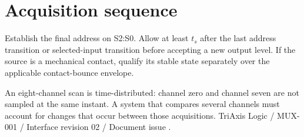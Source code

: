 \documentclass[10pt]{article}
\begin{document}
\section*{Acquisition sequence}
Establish the final address on S2:S0. Allow at least $t_s$ after the last address transition or selected-input transition before accepting a new output level. If the source is a mechanical contact, qualify its stable state separately over the applicable contact-bounce envelope.

An eight-channel scan is time-distributed: channel zero and channel seven are not sampled at the same instant. A system that compares several channels must account for changes that occur between those acquisitions.
\vfill
{\scriptsize\color{Muted}TriAxis Logic / MUX-001 / Interface revision 02 / Document issue \PresentationRevision.}
\end{document}
